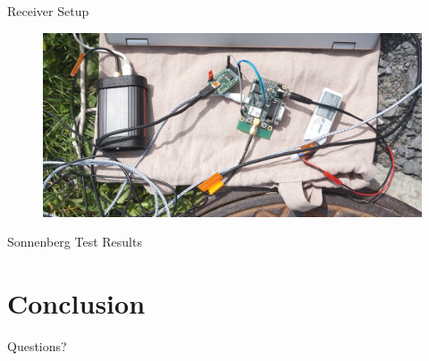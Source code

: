 \documentclass[12pt, compress, xcolor=table]{beamer}
\begin{document}
\begin{frame}{Receiver Setup}
 \begin{figure}
  \includegraphics[width=\textwidth]{images/measurement_kriens_receiver.jpg}
 \end{figure}
\end{frame}

\begin{frame}{Sonnenberg Test Results}
 \begin{figure}
  
 \end{figure}
\end{frame}


\section{Conclusion}

\begin{frame}[standout]
 Questions?
\end{frame}
\end{document}
